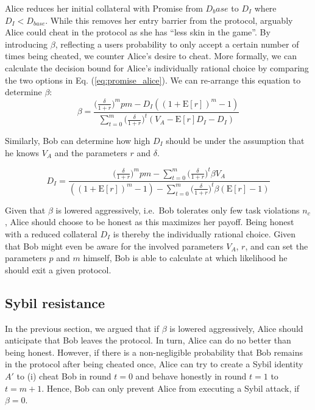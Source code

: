 \documentclass[runningheads]{llncs}
\newcommand{\sys}{Promise\xspace}
\newcommand{\dom}[1]{\todo[linecolor=green,backgroundcolor=green!25,bordercolor=green,inline,caption={}]{Comment by Dominik: #1}}
\begin{document}
Alice reduces her initial collateral with \sys from $D_base$ to $D_I$ where $D_I < D_{base}$.
While this removes her entry barrier from the protocol, arguably Alice could cheat in the protocol as she has ``less skin in the game''.
By introducing $\beta$, reflecting a users probability to only accept a certain number of times being cheated, we counter Alice's desire to cheat.
More formally, we can calculate the decision bound for Alice's individually rational choice by comparing the two options in Eq. (\ref{eq:promise_alice}).
We can re-arrange this equation to determine $\beta$:
\begin{equation}
    \label{eq:beta}
    \beta = \frac{\big( \frac{\delta}{1+r} \big)^{m} pm - D_{I}((1+\mathrm{E}[r])^{m}-1)}{\sum_{t=0}^{m} \big( \frac{\delta}{1+r} \big)^{t} (V_A - \mathrm{E}[r]D_{I}-D_{I})}
\end{equation}

Similarly, Bob can determine how high $D_I$ should be under the assumption that he knows $V_A$ and the parameters $r$ and $\delta$.

\begin{equation}
    \label{eq:d_initial}
    D_I = \frac{\big( \frac{\delta}{1+r} \big)^{m} pm - \sum_{t=0}^{m} \big( \frac{\delta}{1+r} \big)^{t} \beta V_A}{ ((1+\mathrm{E}[r])^{m}-1) - \sum_{t=0}^{m} \big( \frac{\delta}{1+r} \big)^{t} \beta (\mathrm{E}[r]-1)}
\end{equation}

Given that $\beta$ is lowered aggressively, i.e.\ Bob tolerates only few task violations $n_c$, Alice should choose to be honest as this maximizes her payoff.
Being honest with a reduced collateral $D_I$ is thereby the individually rational choice.
Given that Bob might even be aware for the involved parameters $V_A$, $r$, and can set the parameters $p$ and $m$ himself, Bob is able to calculate at which likelihood he should exit a given protocol.

\subsection{Sybil resistance}
In the previous section, we argued that if $\beta$ is lowered aggressively, Alice should anticipate that Bob leaves the protocol.
In turn, Alice can do no better than being honest.
However, if there is a non-negligible probability that Bob remains in the protocol after being cheated once, Alice can try to create a Sybil identity $A'$ to (i) cheat Bob in round $t=0$ and behave honestly in round $t=1$ to $t=m+1$.
Hence, Bob can only prevent Alice from executing a Sybil attack, if $\beta = 0$.
\end{document}
